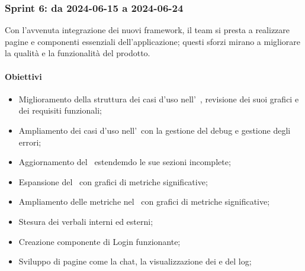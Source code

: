 \subsubsection{Sprint 6: da 2024-06-15 a 2024-06-24}
Con l'avvenuta integrazione dei nuovi framework, il team si presta a realizzare pagine e componenti essenziali dell'applicazione; questi sforzi mirano a migliorare la qualità e la funzionalità del prodotto.


\paragraph{Obiettivi}
\begin{itemize}
  \item Miglioramento della struttura dei casi d'uso nell'\AdR\ , revisione dei suoi grafici e dei requisiti funzionali;
  \item Ampliamento dei casi d'uso nell'\AdR\ con la gestione del debug e gestione degli errori;
  \item Aggiornamento del \PdP\ estendemdo le sue sezioni incomplete;
  \item Espansione del \PdQ\ con grafici di metriche significative;
  \item Ampliamento delle metriche nel \PdQ\ con grafici di metriche significative;
  \item Stesura dei verbali interni ed esterni;
  \item Creazione componente di Login funzionante;
  \item Sviluppo di pagine  come la chat, la visualizzazione dei  e del log;
\end{itemize}

\vspace{0.5\baselineskip}
\par [Inserire Gantt]